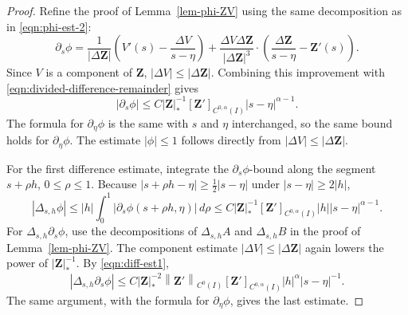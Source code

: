 \documentclass[11pt,reqno]{amsart}
\theoremstyle{plain}
\theoremstyle{definition}
\numberwithin{equation}{section}
\newcommand{\paren}[1]{\left(#1\right)}
\newcommand{\p}{\partial}
\newcommand{\bm}[1]{\boldsymbol{#1}}
\newcommand{\abs}[1]{\left\lvert #1 \right\rvert}
\newcommand{\norm}[1]{\left\lVert #1 \right\rVert}
\newcommand{\ci}[1]{C^{#1}(I)}
\begin{document}
\begin{proof}
Refine the proof of Lemma~\ref{lem-phi-ZV} using the same decomposition as
in \eqref{eqn:phi-est-2}:
\begin{equation}
    \p_s\phi
    =
    \frac{1}{\abs{\Delta\bm Z}}
    \paren{V'(s)-\frac{\Delta V}{s-\eta}}
    +
    \frac{\Delta V\Delta\bm Z}{\abs{\Delta\bm Z}^3}
    \cdot
    \paren{\frac{\Delta\bm Z}{s-\eta}-\bm Z'(s)}.
\end{equation}
Since $V$ is a component of $\bm Z$,
$\abs{\Delta V}\le \abs{\Delta\bm Z}$.  Combining this improvement with
\eqref{eqn:divided-difference-remainder} gives
\begin{equation}
    \abs{\p_s\phi}
    \le C\abs{\bm Z}_*^{-1}[\bm Z']_{\ci{0,\alpha}}
    \abs{s-\eta}^{\alpha-1}.
\end{equation}
The formula for $\p_\eta\phi$ is the same with $s$ and $\eta$
interchanged, so the same bound holds for $\p_\eta\phi$.  The estimate
$\abs{\phi}\le 1$ follows directly from
$\abs{\Delta V}\le\abs{\Delta\bm Z}$.

For the first difference estimate, integrate the $\p_s\phi$-bound
along the segment $s+\rho h$, $0\le\rho\le1$.  Because
$\abs{s+\rho h-\eta}\ge \frac12\abs{s-\eta}$ under
$\abs{s-\eta}\ge2\abs h$,
\begin{equation}
    \abs{\Delta_{s,h}\phi}
    \le |h|\int_0^1 \abs{\p_s\phi(s+\rho h,\eta)}\,d\rho
    \le C\abs{\bm Z}_*^{-1}[\bm Z']_{\ci{0,\alpha}}
    |h|\abs{s-\eta}^{\alpha-1}.
\end{equation}
For $\Delta_{s,h}\p_s\phi$, use the decompositions of
$\Delta_{s,h}A$ and $\Delta_{s,h}B$ in the proof of
Lemma~\ref{lem-phi-ZV}. The component estimate
$\abs{\Delta V}\le\abs{\Delta\bm Z}$ again lowers the power of
$\abs{\bm Z}_*^{-1}$. By \eqref{eqn:diff-est1},
\begin{equation}
    \abs{\Delta_{s,h}\p_s\phi}
    \le C\abs{\bm Z}_*^{-2}\norm{\bm Z'}_{\ci{0}}[\bm Z']_{\ci{0,\alpha}}|h|^\alpha\abs{s-\eta}^{-1}.
\end{equation}
The same argument, with the formula for $\p_\eta\phi$, gives the last
estimate.
\end{proof}
\end{document}
